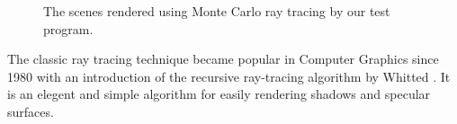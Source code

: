 \begin{figure}[htp] 
\begin{center}
    \renewcommand{\thefigure}{\thechapter.\arabic{figure}}
    \caption[]{The scenes rendered using Monte Carlo ray tracing by our test program. }
    \label{fig:rt_images} 
\end{center} 
\end{figure}

The classic ray tracing technique became popular in Computer Graphics since 1980 with an introduction of the recursive ray-tracing algorithm by Whitted \cite{Whitted1980}. It is an elegent and simple algorithm for easily rendering shadows and specular surfaces. 

